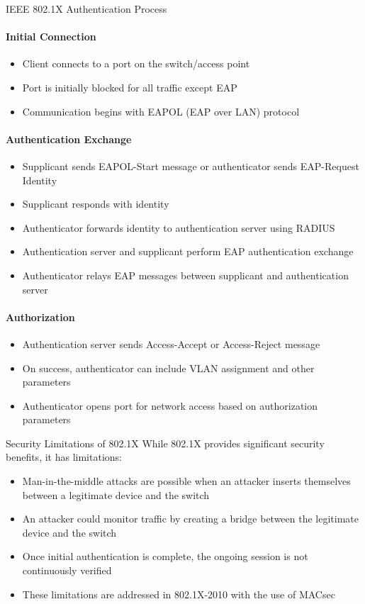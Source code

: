 \begin{KR}{IEEE 802.1X Authentication Process}
\paragraph{Initial Connection}
\begin{itemize}
    \item Client connects to a port on the switch/access point
    \item Port is initially blocked for all traffic except EAP
    \item Communication begins with EAPOL (EAP over LAN) protocol
\end{itemize}

\paragraph{Authentication Exchange}
\begin{itemize}
    \item Supplicant sends EAPOL-Start message or authenticator sends EAP-Request Identity
    \item Supplicant responds with identity
    \item Authenticator forwards identity to authentication server using RADIUS
    \item Authentication server and supplicant perform EAP authentication exchange
    \item Authenticator relays EAP messages between supplicant and authentication server
\end{itemize}

\paragraph{Authorization}
\begin{itemize}
    \item Authentication server sends Access-Accept or Access-Reject message
    \item On success, authenticator can include VLAN assignment and other parameters
    \item Authenticator opens port for network access based on authorization parameters
\end{itemize}
\end{KR}

\begin{theorem}{Security Limitations of 802.1X}
While 802.1X provides significant security benefits, it has limitations:
\begin{itemize}
    \item Man-in-the-middle attacks are possible when an attacker inserts themselves between a legitimate device and the switch
    \item An attacker could monitor traffic by creating a bridge between the legitimate device and the switch
    \item Once initial authentication is complete, the ongoing session is not continuously verified
    \item These limitations are addressed in 802.1X-2010 with the use of MACsec
\end{itemize}
\end{theorem}

